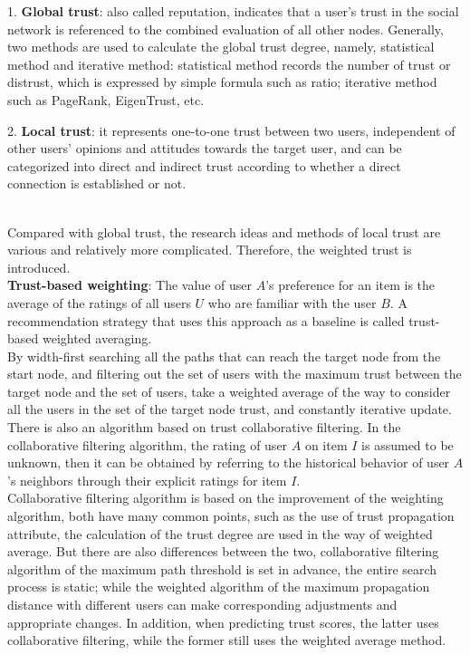 1.
\textbf{Global trust}:
also called reputation, indicates that a user's trust in the social network is referenced 
to the combined evaluation of all other nodes\cite{b22}. Generally, two methods are used 
to calculate the global trust degree, namely, statistical method and iterative method: 
statistical method records the number of trust or distrust, which is expressed by simple 
formula such as ratio; iterative method such as PageRank, EigenTrust, etc\cite{b15}.

2.
\textbf{Local trust}:
it represents one-to-one trust between two users, independent of other users' opinions 
and attitudes towards the target user, and can be categorized into direct and indirect 
trust according to whether a direct connection is established or not\cite{b15}.

\\
Compared with global trust, the research ideas and methods of local trust are various and 
relatively more complicated. Therefore, the weighted trust is introduced.
\\
\textbf{Trust-based weighting}:
The value of user $A$'s preference for an item is the average of the ratings of 
all users $U$ who are familiar with the user $B$. A recommendation strategy that 
uses this approach as a baseline is called trust-based weighted averaging\cite{b15}.
\\
By width-first searching all the paths that can reach the target node from the start node, 
and filtering out the set of users with the maximum trust between the target node and 
the set of users, take a weighted average of the way to consider all the users in the 
set of the target node trust, and constantly iterative update\cite{b27}.
\\
There is also an algorithm based on trust collaborative filtering. In the collaborative 
filtering algorithm, the rating of user $A$ on item $I$ is assumed to be unknown, then it 
can be obtained by referring to the historical behavior of user $A$'s neighbors through 
their explicit ratings for item $I$\cite{b29}.
\\
Collaborative filtering algorithm is based on the improvement of the weighting algorithm, 
both have many common points, such as the use of trust propagation attribute, the 
calculation of the trust degree are used in the way of weighted average\cite{b15}. But there are 
also differences between the two, collaborative filtering algorithm of the maximum path 
threshold is set in advance, the entire search process is static; while the weighted 
algorithm of the maximum propagation distance with different users can make corresponding 
adjustments and appropriate changes. In addition, when predicting trust scores, the latter 
uses collaborative filtering, while the former still uses the weighted average method\cite{b27}.

